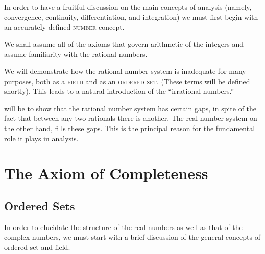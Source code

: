 
In order to have a fruitful discussion on the main concepts of analysis (namely, convergence, continuity, differentiation, and integration) we must first begin with an accurately-defined \textsc{number} concept.

We shall assume all of the axioms that govern arithmetic of the integers and assume familiarity with the rational numbers.  

We will demonstrate how the rational number system is inadequate for many purposes, both as a \textsc{field} and as an \textsc{ordered set}.   (These terms will be defined shortly).   This leads to a natural introduction of the ``irrational numbers.''

 will be to show that the rational number system has certain gaps, in spite of the fact that between any two rationals there is another.   The real number system on the other hand, fills these gaps.  This is the principal reason for the fundamental role it plays in analysis. 

\bigskip

\section{The Axiom of Completeness}
\subsection{Ordered Sets}\label{sec:ordered-sets}
In order to elucidate the structure of the real numbers as well as that of the complex numbers, we must start with a brief discussion of the general concepts of ordered set and field.



